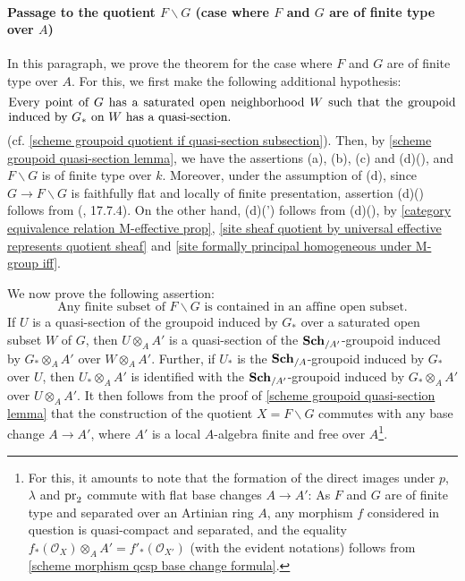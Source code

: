 \paragraph{Passage to the quotient \texorpdfstring{$F\backslash G$}{FG} (case where \texorpdfstring{$F$}{F} and \texorpdfstring{$G$}{G} are of finite type over $A$)}\label{scheme alg group group quotient ft case paragraph}
In this paragraph, we prove the theorem for the case where $F$ and $G$ are of finite type over $A$. For this, we first make the following additional hypothesis:
\begin{equation}\label{scheme alg group group quotient exists-1}
\parbox{5in}{%
    Every point of $G$ has a saturated open neighborhood $W$ such that the groupoid induced by $G_*$ on $W$ has a quasi-section.%
}
\end{equation}
(cf. \autoref{scheme groupoid quotient if quasi-section subsection}). Then, by \cref{scheme groupoid quasi-section lemma}, we have the assertions (a), (b), (c) and (d)(), and $F\backslash G$ is of finite type over $k$. Moreover, under the assumption of (d), since $G\to F\backslash G$ is faithfully flat and locally of finite presentation, assertion (d)() follows from (\cite{EGA4-4}, 17.7.4). On the other hand, (d)(') follows from (d)(), by \cref{category equivalence relation M-effective prop}, \cref{site sheaf quotient by universal effective represents quotient sheaf} and \cref{site formally principal homogeneous under M-group iff}.\par

We now prove the following assertion:
\begin{equation}\label{scheme alg group group quotient exists-2}
\text{Any finite subset of $F\backslash G$ is contained in an affine open subset.}
\end{equation}
If $U$ is a quasi-section of the groupoid induced by $G_*$ over a saturated open subset $W$ of $G$, then $U\otimes_AA'$ is a quasi-section of the $\mathbf{Sch}_{/A'}$-groupoid induced by $G_*\otimes_AA'$ over $W\otimes_AA'$. Further, if $U_*$ is the $\mathbf{Sch}_{/A}$-groupoid induced by $G_*$ over $U$, then $U_*\otimes_AA'$ is identified with the $\mathbf{Sch}_{/A'}$-groupoid induced by $G_*\otimes_AA'$ over $U\otimes_AA'$. It then follows from the proof of \cref{scheme groupoid quasi-section lemma} that the construction of the quotient $X=F\backslash G$ commutes with any base change $A\to A'$, where $A'$ is a local $A$-algebra finite and free over $A$\footnote{For this, it amounts to note that the formation of the direct images under $p$, $\lambda$ and $\mathrm{pr}_2$ commute with flat base changes $A\to A'$: As $F$ and $G$ are of finite type and separated over an Artinian ring $A$, any morphism $f$ considered in question is quasi-compact and separated, and the equality $f_*(\mathscr{O}_X)\otimes_AA'=f'_*(\mathscr{O}_{X'})$ (with the evident notations) follows from \cref{scheme morphism qcsp base change formula}.}.\par

